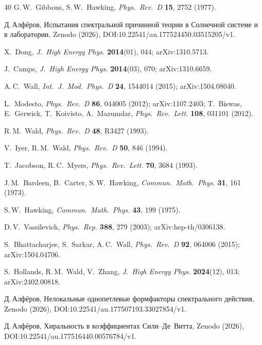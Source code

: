 \documentclass[12pt,a4paper]{article}
\theoremstyle{plain}
\theoremstyle{definition}
\begin{document}
\begin{thebibliography}{40}
G.\,W.~Gibbons, S.\,W.~Hawking,
\textit{Phys.\ Rev.\ D} \textbf{15}, 2752 (1977).

Д.\,Алфёров,
Испытания спектральной причинной теории в Солнечной системе
и в лаборатории,
Zenodo (2026), DOI:10.22541/au.177524450.03515205/v1.

X.~Dong,
\textit{J.\ High Energy Phys.} \textbf{2014}(01), 044;
arXiv:1310.5713.

J.~Camps,
\textit{J.\ High Energy Phys.} \textbf{2014}(03), 070;
arXiv:1310.6659.

A.\,C.~Wall,
\textit{Int.\ J.\ Mod.\ Phys.\ D} \textbf{24}, 1544014 (2015);
arXiv:1504.08040.

L.~Modesto,
\textit{Phys.\ Rev.\ D} \textbf{86}, 044005 (2012);
arXiv:1107.2403;
T.~Biswas, E.~Gerwick, T.~Koivisto, A.~Mazumdar,
\textit{Phys.\ Rev.\ Lett.} \textbf{108}, 031101 (2012).

R.\,M.~Wald,
\textit{Phys.\ Rev.\ D} \textbf{48}, R3427 (1993).

V.~Iyer, R.\,M.~Wald,
\textit{Phys.\ Rev.\ D} \textbf{50}, 846 (1994).

T.~Jacobson, R.\,C.~Myers,
\textit{Phys.\ Rev.\ Lett.} \textbf{70}, 3684 (1993).

J.\,M.~Bardeen, B.~Carter, S.\,W.~Hawking,
\textit{Commun.\ Math.\ Phys.} \textbf{31}, 161 (1973).

S.\,W.~Hawking,
\textit{Commun.\ Math.\ Phys.} \textbf{43}, 199 (1975).

D.\,V.~Vassilevich,
\textit{Phys.\ Rep.} \textbf{388}, 279 (2003);
arXiv:hep-th/0306138.

S.~Bhattacharjee, S.~Sarkar, A.\,C.~Wall,
\textit{Phys.\ Rev.\ D} \textbf{92}, 064006 (2015);
arXiv:1504.04706.

S.~Hollands, R.\,M.~Wald, V.~Zhang,
\textit{J.\ High Energy Phys.} \textbf{2024}(12), 013;
arXiv:2402.00818.

Д.\,Алфёров,
Нелокальные однопетлевые формфакторы спектрального
действия,
Zenodo (2026), DOI:10.22541/au.177507193.33027854/v1.

Д.\,Алфёров,
Хиральность в коэффициентах Сили--Де~Витта,
Zenodo (2026), DOI:10.22541/au.177516440.00576784/v1.


\end{thebibliography}
\end{document}
